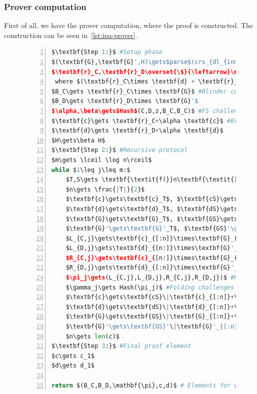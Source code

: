 \subsubsection*{Prover computation}
First of all, we have the prover computation, where the proof is constructed.
The construction can be seen in~\autoref{lst:ipa-prover}.

\begin{figure}[!htb]
    \begin{lstlisting}[language=Python,mathescape=true,label={lst:ipa-prover},numbers=left,caption={Prover computation for CAAU-IPA in CAAUrdleproofs},captionpos=b,frame=single]
$\textbf{Step 1:}$ #Setup phase
$(\textbf{G},\textbf{G}',H)\gets$parse$(crs_{dl_{inner}})$
$\textbf{r}_C,\textbf{r}_D\overset{\$}{\leftarrow}\mathbb{F}^n$ #Vector blinders
 where $(\textbf{r}_C\times \textbf{d} + \textbf{r}_D\times \textbf{c})=0\text{ and }\textbf{r}_C\times \textbf{r}_D=0$
$B_C\gets \textbf{r}_C\times \textbf{G}$ #Blinder commitments
$B_D\gets \textbf{r}_D\times \textbf{G}'$
$\alpha,\beta\gets$Hash$(C,D,z,B_C,B_C)$ #FS challenges
$\textbf{c}\gets \textbf{r}_C+\alpha \textbf{c}$ #Blinded vectors
$\textbf{d}\gets \textbf{r}_D+\alpha \textbf{d}$
$H\gets\beta H$
$\textbf{Step 2:}$ #Recursive protocol
$m\gets \lceil \log n\rceil$
while $1\leq j\leq m:$
    $T,S\gets \textbf{\textit{f(}}n\textbf{\textit{)}}$ #Scheme function
    $n\gets \frac{|T|}{2}$
    $\textbf{c}\gets\textbf{c}_T$, $\textbf{cS}\gets\textbf{c}_S$ #Vector splitting
    $\textbf{d}\gets\textbf{d}_T$, $\textbf{dS}\gets\textbf{d}_S$
    $\textbf{G}\gets\textbf{G}_T$, $\textbf{GS}\gets\textbf{G}_S$
    $\textbf{G}'\gets\textbf{G}'_T$, $\textbf{GS}'\gets\textbf{G}'_T$
    $L_{C,j}\gets\textbf{c}_{[:n]}\times\textbf{G}_{[n:]}+(\textbf{c}_{[:n]}\times\textbf{d}_{[n:]})H$ #Cross-comm
    $L_{D,j}\gets\textbf{d}_{[n:]}\times\textbf{G}'_{[:n]}$
    $R_{C,j}\gets\textbf{c}_{[n:]}\times\textbf{G}_{[:n]}+(\textbf{c}_{[n:]}\times\textbf{d}_{[:n]})H$
    $R_{D,j}\gets\textbf{d}_{[:n]}\times\textbf{G}'_{[n:]}$
    $\pi_j\gets(L_{C,j},L_{D,j},R_{C,j},R_{D,j})$ #Proof elements
    $\gamma_j\gets Hash(\pi_j)$ #Folding challenges
    $\textbf{c}\gets\textbf{cS}\|\textbf{c}_{[:n]}+\gamma_j^{-1}\textbf{c}_{[n:]}$ #Next round vectors
    $\textbf{d}\gets\textbf{dS}\|\textbf{d}_{[:n]}+\gamma_j\textbf{d}_{[n:]}$
    $\textbf{G}\gets\textbf{GS}\|\textbf{G}_{[:n]}+\gamma_j\textbf{G}_{[n:]}$
    $\textbf{G}'\gets\textbf{GS}'\|\textbf{G}'_{[:n]}+\gamma_j^{-1}\textbf{G}'_{[n:]}$
    $n\gets len(c)$
$\textbf{Step 3:}$ #Final proof element
$c\gets c_1$
$d\gets d_1$

return $(B_C,B_D,\mathbf{\pi},c,d)$ # Elements for verifier
    \end{lstlisting}
\label{fig:ipa-prover}
\end{figure}
